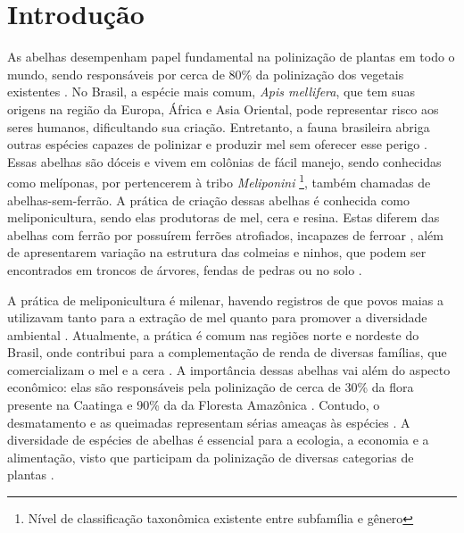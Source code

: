
\chapter{Introdução}\label{cap:introducao}
As abelhas desempenham papel fundamental na polinização de plantas em todo o mundo, sendo responsáveis por cerca de 80\% da polinização dos vegetais existentes \cite{roberto_de_de_alex_rodrigues_2020}. No Brasil, a espécie mais comum, \textit{Apis mellifera}, que tem suas origens na região da Europa, África e Asia Oriental, pode representar risco aos seres humanos, dificultando sua criação. Entretanto, a fauna brasileira abriga outras espécies capazes de polinizar e produzir mel sem oferecer esse perigo \cite{costa_viana_farias_santos_2012}. Essas abelhas são dóceis e vivem em colônias de fácil manejo, sendo conhecidas como melíponas, por pertencerem à tribo \textit{Meliponini} \footnote{Nível de classificação taxonômica existente entre subfamília e gênero}, também chamadas de abelhas-sem-ferrão. 
A prática de criação dessas abelhas é conhecida como meliponicultura, sendo elas produtoras de mel, cera e resina. Estas diferem das abelhas com ferrão por possuírem ferrões atrofiados, incapazes de ferroar \cite{Freitas:2000}, além de apresentarem variação na estrutura das colmeias e ninhos, que podem ser encontrados em troncos de árvores, fendas de pedras ou no solo \cite{Santos_2010}.



A prática de meliponicultura é milenar, havendo registros de que povos maias a utilizavam tanto para a extração de mel quanto para promover a diversidade ambiental \cite{rodrigues2005etnoconhecimento}. Atualmente, a prática é comum nas regiões norte e nordeste do Brasil, onde contribui para a complementação de renda de diversas famílias, que comercializam o mel e a cera \cite{Santos:2020}. A importância dessas abelhas vai além do aspecto econômico: elas são responsáveis pela polinização de cerca de 30\% da flora presente na Caatinga e 90\% da da Floresta Amazônica \cite{Pereira:2017}. Contudo, o desmatamento e as queimadas representam sérias ameaças às espécies . A diversidade de espécies de abelhas é essencial para a ecologia, a economia e a alimentação, visto que participam da polinização de diversas categorias de plantas \cite{dos2021diversidade}.

